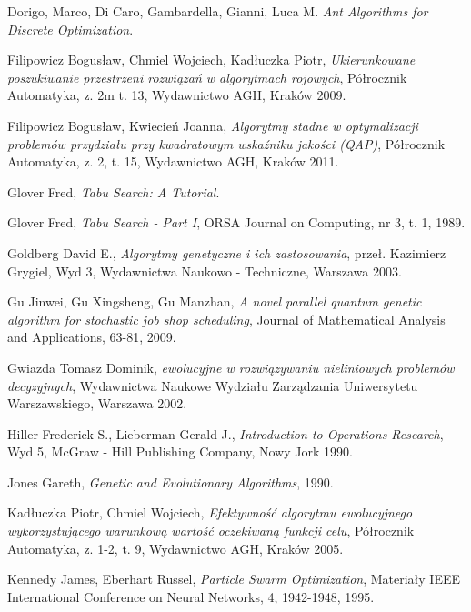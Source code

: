 
%
\begin{thebibliography}{99}

 Dorigo, Marco, Di Caro, Gambardella, Gianni, Luca M. \textit{Ant Algorithms for Discrete Optimization}.

 Filipowicz Bogusław, Chmiel Wojciech, Kadłuczka Piotr, \textit{Ukierunkowane poszukiwanie przestrzeni rozwiązań w algorytmach rojowych}, Półrocznik Automatyka, z. 2m t. 13, Wydawnictwo AGH, Kraków 2009.

 Filipowicz Bogusław, Kwiecień Joanna, \textit{Algorytmy stadne w optymalizacji problemów przydziału przy kwadratowym wskaźniku jakości (QAP)}, Półrocznik Automatyka, z. 2, t. 15, Wydawnictwo AGH, Kraków 2011.

 Glover Fred, \textit{Tabu Search: A Tutorial}.

 Glover Fred, \textit{Tabu Search - Part I}, ORSA Journal on Computing, nr 3, t. 1, 1989.

 Goldberg David E., \textit{Algorytmy genetyczne i ich zastosowania}, przeł. Kazimierz Grygiel, Wyd 3, Wydawnictwa Naukowo - Techniczne, Warszawa 2003.

 Gu Jinwei, Gu Xingsheng, Gu Manzhan, \textit{A novel parallel quantum genetic algorithm for stochastic job shop scheduling}, Journal of Mathematical Analysis and Applications, 63-81, 2009.

 Gwiazda Tomasz Dominik, \textit{ ewolucyjne w rozwiązywaniu nieliniowych problemów decyzyjnych}, Wydawnictwa Naukowe Wydziału Zarządzania Uniwersytetu Warszawskiego, Warszawa 2002.

 Hiller Frederick S., Lieberman Gerald J., \textit{Introduction to Operations Research}, Wyd 5, McGraw - Hill Publishing Company, Nowy Jork 1990.

 Jones Gareth, \textit{Genetic and Evolutionary Algorithms}, 1990.

 Kadłuczka Piotr, Chmiel Wojciech, \textit{Efektywność algorytmu ewolucyjnego wykorzystującego warunkową wartość oczekiwaną funkcji celu}, Półrocznik Automatyka, z. 1-2, t. 9, Wydawnictwo AGH, Kraków 2005.

 Kennedy James, Eberhart Russel, \textit{Particle Swarm Optimization}, Materiały IEEE International Conference on Neural Networks, 4, 1942-1948, 1995.


\end{thebibliography}

